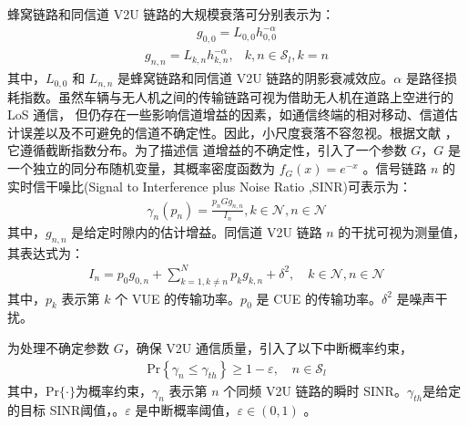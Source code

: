 蜂窝链路和同信道 V2U 链路的大规模衰落可分别表示为：
\begin{eqnarray}\label{E2-3}
g_{0,0}=L_{0,0}h_{0,0}^{-\alpha}
\end{eqnarray}
\begin{eqnarray}\label{E2-4}
g_{n,n}=L_{k,n}h_{k,n}^{-\alpha},          &k, n\in \mathcal{S}_l, k=n
\end{eqnarray}
其中，$L_{0,0}$ 和 $L_{n,n}$ 是蜂窝链路和同信道 V2U 链路的阴影衰减效应。$\alpha$ 是路径损耗指数。虽然车辆与无人机之间的传输链路可视为借助无人机在道路上空进行的 LoS 通信，
但仍存在一些影响信道增益的因素，如通信终端的相对移动、信道估计误差以及不可避免的信道不确定性。因此，小尺度衰落不容忽视。根据文献 \cite{CCO}，它遵循截断指数分布。为了描述信
道增益的不确定性，引入了一个参数 $G$，$G$ 是一个独立的同分布随机变量，其概率密度函数为 $f_G (x)=e^{-x}$ 。信号链路 $n$ 的实时信干噪比(Signal to Interference plus Noise Ratio ,SINR)可表示为：
\begin{eqnarray}\label{E2-5}
\gamma_{n}(p_n)=\frac{p_{n}G g_{n,n}}{I_n}, k\in\mathcal{N},n\in\mathcal{N}
\end{eqnarray}
其中，$g_{n,n}$ 是给定时隙内的估计增益。同信道 V2U 链路 $n$ 的干扰可视为测量值，其表达式为：
\begin{eqnarray}\label{E2-6}
I_n=p_0 g_{0,n}+\!\!\!\sum\limits_{k=1,k\neq n}^N\!\!\!\! p_k g_{k,n}+\delta^2, \quad k\in\mathcal{N},n\in\mathcal{N}
\end{eqnarray}
其中，$p_k$ 表示第 $k$ 个 VUE 的传输功率。$p_0$ 是 CUE 的传输功率。$\delta^2$ 是噪声干扰。

为处理不确定参数 $G$，确保 V2U 通信质量，引入了以下中断概率约束，
\begin{eqnarray}\label{E2-7}
\textrm{Pr}\left\{\gamma_{n} \leq \gamma_{th}\right\}\geq1-\varepsilon,\quad  n\in\mathcal{S}_l
\end{eqnarray}
其中，$\textrm{Pr}\{\cdot\}$为概率约束，$\gamma_{n}$ 表示第 $n$ 个同频 V2U 链路的瞬时 SINR。$\gamma_{th}$是给定的目标 SINR阈值，。$\varepsilon$ 是中断概率阈值，$\varepsilon \in (0,1)$ 。

